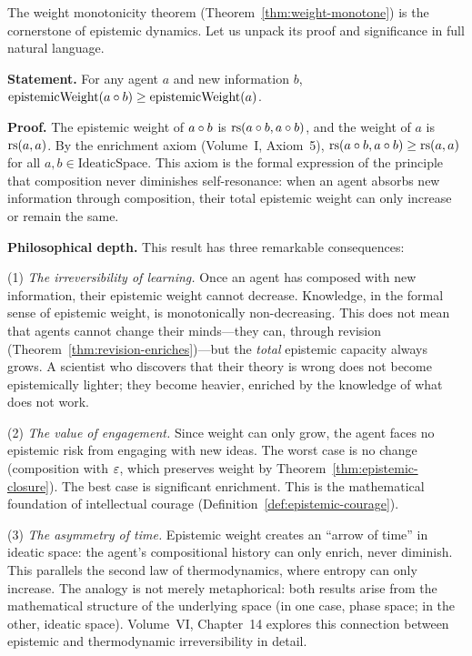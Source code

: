 \begin{remark}
The weight monotonicity theorem (Theorem~\ref{thm:weight-monotone}) is the
cornerstone of epistemic dynamics. Let us unpack its proof and significance
in full natural language.

\textbf{Statement.} For any agent $a$ and new information $b$,
$\mathrm{epistemicWeight}(a \circ b) \geq \mathrm{epistemicWeight}(a)$.

\textbf{Proof.} The epistemic weight of $a \circ b$ is $\mathrm{rs}(a \circ b,
a \circ b)$, and the weight of $a$ is $\mathrm{rs}(a, a)$. By the enrichment axiom
(Volume~I, Axiom~5), $\mathrm{rs}(a \circ b, a \circ b) \geq \mathrm{rs}(a, a)$ for all
$a, b \in \mathrm{IdeaticSpace}$. This axiom is the formal expression of the
principle that composition never diminishes self-resonance: when an agent absorbs
new information through composition, their total epistemic weight can only
increase or remain the same.

\textbf{Philosophical depth.} This result has three remarkable consequences:

(1) \emph{The irreversibility of learning.} Once an agent has composed with new
information, their epistemic weight cannot decrease. Knowledge, in the formal
sense of epistemic weight, is monotonically non-decreasing. This does not mean
that agents cannot change their minds---they can, through revision
(Theorem~\ref{thm:revision-enriches})---but the \emph{total} epistemic capacity
always grows. A scientist who discovers that their theory is wrong does not
become epistemically lighter; they become heavier, enriched by the knowledge
of what does not work.

(2) \emph{The value of engagement.} Since weight can only grow, the agent faces
no epistemic risk from engaging with new ideas. The worst case is no change
(composition with $\varepsilon$, which preserves weight by Theorem~\ref{thm:epistemic-closure}).
The best case is significant enrichment. This is the mathematical foundation of
intellectual courage (Definition~\ref{def:epistemic-courage}).

(3) \emph{The asymmetry of time.} Epistemic weight creates an ``arrow of time''
in ideatic space: the agent's compositional history can only enrich, never
diminish. This parallels the second law of thermodynamics, where entropy can only
increase. The analogy is not merely metaphorical: both results arise from the
mathematical structure of the underlying space (in one case, phase space; in the
other, ideatic space). Volume~VI, Chapter~14 explores this connection between
epistemic and thermodynamic irreversibility in detail.
\end{remark}

